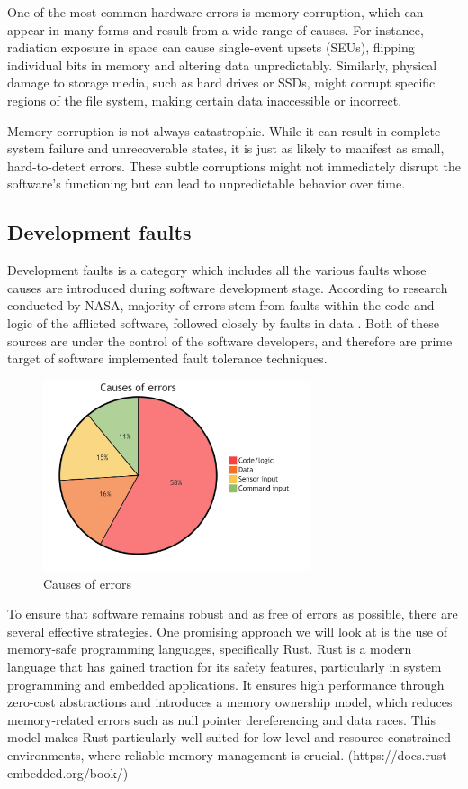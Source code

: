 \documentclass[12pt, letterpaper]{article}
\begin{document}
One of the most common hardware errors is memory corruption, which can appear in many forms and result from a wide range of causes. For instance, radiation exposure in space can cause single-event upsets (SEUs), flipping individual bits in memory and altering data unpredictably. Similarly, physical damage to storage media, such as hard drives or SSDs, might corrupt specific regions of the file system, making certain data inaccessible or incorrect.

Memory corruption is not always catastrophic. While it can result in complete system failure and unrecoverable states, it is just as likely to manifest as small, hard-to-detect errors. These subtle corruptions might not immediately disrupt the software's functioning but can lead to unpredictable behavior over time.

\subsection{Development faults}

Development faults is a category which includes all the various faults whose causes are introduced during software development stage. According to research conducted by NASA, majority of errors stem from faults within the code and logic of the afflicted software, followed closely by faults in data \cite{nasa:stats}. Both of these sources are under the control of the software developers, and therefore are prime target of software implemented fault tolerance techniques.

\begin{figure}[hbt]
    \centering
    \includegraphics[width=0.7\textwidth]{diagrams/stats/piechart.png}
    \caption{Causes of errors \cite{nasa:stats}}
\end{figure}

To ensure that software remains robust and as free of errors as possible, there are several effective strategies. One promising approach we will look at is the use of memory-safe programming languages, specifically Rust. Rust is a modern language that has gained traction for its safety features, particularly in system programming and embedded applications. It ensures high performance through zero-cost abstractions and introduces a memory ownership model, which reduces memory-related errors such as null pointer dereferencing and data races. This model makes Rust particularly well-suited for low-level and resource-constrained environments, where reliable memory management is crucial. (https://docs.rust-embedded.org/book/) \\
\end{document}
